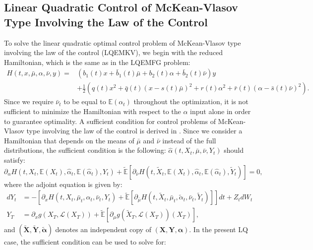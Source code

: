 \documentclass[11pt]{article}
\newcommand\cL{\mathcal L}
\begin{document}
\subsection{\textbf{Linear Quadratic Control of McKean-Vlasov Type Involving the Law of the Control}}\label{sec:EMKV}
To solve the linear quadratic optimal control problem of McKean-Vlasov type involving the law of the control (LQEMKV), we begin with the reduced Hamiltonian, which is the same as in the LQEMFG problem:
\begin{equation*}
\begin{split}
    H(t,x,\bar{\mu},\alpha,\bar{\nu},y)=&(b_1(t)x+\bar{b}_1(t)\bar{\mu}+b_2(t) \alpha+\bar{b}_2(t)\bar{\nu})y\\
    &+\frac{1}{2}\left(q(t)x^2+\bar{q}(t)(x-s(t)\bar{\mu})^2 +r(t)\alpha^2+\bar{r}(t)(\alpha-\bar{s}(t)\bar{\nu})^2\right).
\end{split}
\end{equation*}
Since we require $\bar{\nu}_t$ to be equal to $\mathbb{E}(\alpha_t)$ throughout the optimization, it is not sufficient to minimize the Hamiltonian with respect to the $\alpha$ input alone in order to guarantee optimality. A sufficient condition for control problems of McKean-Vlasov type involving the law of the control is derived in \cite{carmona_acciaio}. Since we consider a Hamiltonian that depends on the means of $\bar{\mu}$ and $\bar{\nu}$ instead of the full distributions, the sufficient condition is the following:
$\hat{\alpha}(t,X_t,\bar{\mu},\bar{\nu},Y_t)$ should satisfy:
\begin{equation*}
    \partial_{\alpha}H(t,X_t,\mathbb{E}(X_t),\hat{\alpha}_t,\mathbb{E}(\hat{\alpha}_t),Y_t)+\tilde{\mathbb{E}} \left[\partial_{\bar{\nu}}H(t,\tilde{X}_t,\mathbb{E}(X_t),\hat{\alpha}_t,\mathbb{E}(\hat{\alpha}_t),\tilde{Y}_t) \right]=0,
\end{equation*}
where the adjoint equation is given by:
\begin{equation*}
\begin{split}
    dY_t&=-\left[\partial_x H(t,X_t,\bar{\mu}_t,\alpha_t,\bar{\nu}_t,Y_t)+\tilde{\mathbb{E}} \left[\partial_{\bar{\mu}}H(t,\tilde{X}_t,\bar{\mu}_t,\tilde{\alpha}_t,\bar{\nu}_t,\tilde{Y}_t) \right] \right]dt+Z_tdW_t \\
    Y_T&=\partial_xg(X_T, \cL(X_T))+\tilde{\mathbb{E}} \left[\partial_{\mu}g(\tilde{X}_T,\cL(X_T))(X_T) \right],
\end{split}
\end{equation*}
and $(\boldsymbol{\tilde{X}},\boldsymbol{\tilde{Y}},\boldsymbol{\tilde{\alpha}})$ denotes an independent copy of $(\boldsymbol{X},\boldsymbol{Y},\boldsymbol{\alpha})$. In the present LQ case, the sufficient condition can be used to solve for:
\end{document}
